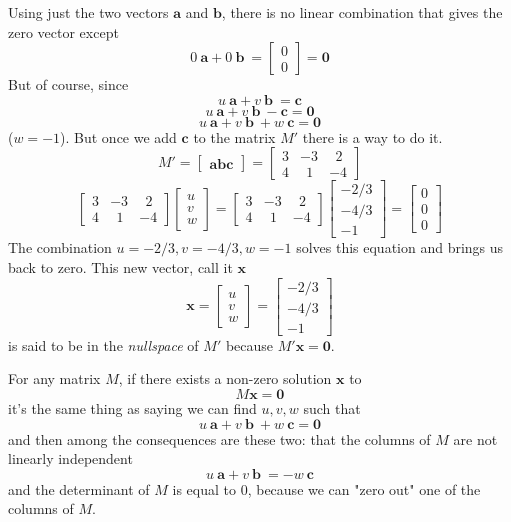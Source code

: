 \documentclass[11pt, oneside]{article}
\begin{document}
Using just the two vectors $\mathbf{a}$ and $\mathbf{b}$, there is no linear combination that gives the zero vector except
\[ 0\ \mathbf{a} +  0 \ \mathbf{b}\ = 
\begin{bmatrix}
0 \\
0
\end{bmatrix}
= \mathbf{0}
\] 
But of course, since
\[ u\ \mathbf{a} +  v \ \mathbf{b}\ = \mathbf{c} \]
\[ u\ \mathbf{a} +  v \ \mathbf{b}\ - \mathbf{c} = \mathbf{0} \]
\[ u\ \mathbf{a} +  v \ \mathbf{b}\ + w \ \mathbf{c} = \mathbf{0} \]
($w=-1$).  
But once we add $\mathbf{c}$ to the matrix $M'$ there is a way to do it.
\[ M' = 
\begin{bmatrix}
\mathbf{a} \mathbf{b} \mathbf{c}
\end{bmatrix}
=
\begin{bmatrix}
3 & -3 & \ \ 2 \\
4 & \ \ 1 & -4
\end{bmatrix}
\]
\[ 
\begin{bmatrix}
3 & -3 & \ \ 2 \\
4 & \ \ 1 & -4
\end{bmatrix}
\begin{bmatrix}
u \\
v \\
w
\end{bmatrix}
=
\begin{bmatrix}
3 & -3 & \ \ 2 \\
4 & \ \ 1 & -4
\end{bmatrix}
\begin{bmatrix}
-2/3 \\
-4/3 \\
- 1
\end{bmatrix}
= 
\begin{bmatrix}
0 \\
0 \\
0
\end{bmatrix}
\]
The combination $u = -2/3, v = -4/3, w = -1$ solves this equation and brings us back to zero.  This new vector, call it $\mathbf{x}$ 
\[ \mathbf{x} = 
\begin{bmatrix}
u \\
v \\
w
\end{bmatrix}
=
\begin{bmatrix}
-2/3 \\
-4/3 \\
- 1
\end{bmatrix}
\]
is said to be in the \emph{nullspace} of $M'$ because $M' \mathbf{x} = \mathbf{0}$.

For any matrix $M$, if there exists a non-zero solution $\mathbf{x}$ to
\[ M \mathbf{x} = \mathbf{0} \]
it's the same thing as saying we can find $u,v,w$ such that
\[ u\ \mathbf{a} +  v \ \mathbf{b}\ + w \ \mathbf{c} = \mathbf{0} \]
and then among the consequences are these two:  that the columns of $M$ are not linearly independent
\[ u\ \mathbf{a} +  v \ \mathbf{b}\ = - w \ \mathbf{c} \]
and the determinant of $M$ is equal to $0$, because we can "zero out" one of the columns of $M$.
\end{document}
